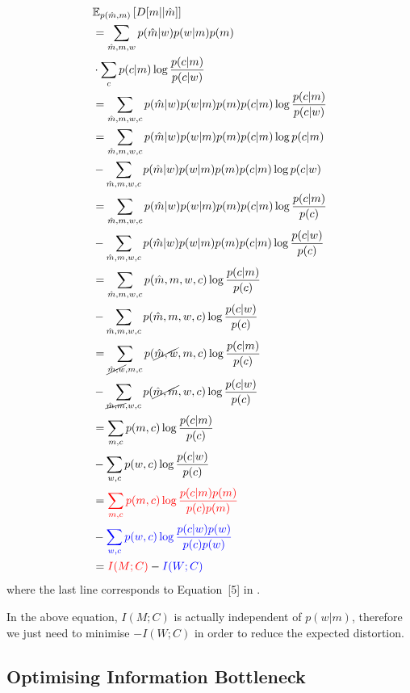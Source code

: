 \documentclass[11pt]{article}
\begin{document}
\begin{align*}
        & \mathbb{E}_{p(\hat{m},m)}\left[D[m||\hat{m}]\right] \\
        & = \sum_{\hat{m},m,w} p(\hat{m}|w)p(w|m)p(m) \\ 
        & \cdot \sum_{c} p(c|m) \log \frac{p(c|m)}{p(c|w)} \\
        & = \sum_{\hat{m},m,w,c} p(\hat{m}|w)p(w|m)p(m)p(c|m)\log \frac{p(c|m)}{p(c|w)} \\
        & = \sum_{\hat{m},m,w,c} p(\hat{m}|w)p(w|m)p(m)p(c|m) \log p(c|m) \\
        & - \sum_{\hat{m},m,w,c} p(\hat{m}|w)p(w|m)p(m)p(c|m) \log p(c|w) \\ 
        & = \sum_{\hat{m},m,w,c} p(\hat{m}|w)p(w|m)p(m)p(c|m) \log \frac{p(c|m)}{p(c)} \\ 
        & - \sum_{\hat{m},m,w,c} p(\hat{m}|w)p(w|m)p(m)p(c|m) \log \frac{p(c|w)}{p(c)} \\ 
        & = \sum_{\hat{m},m,w,c} p(\hat{m},m,w,c) \log \frac{p(c|m)}{p(c)} \\
        & - \sum_{\hat{m},m,w,c} p(\hat{m},m,w,c) \log \frac{p(c|w)}{p(c)} \\ 
        & = \sum_{\cancel{\hat{m},w},m,c} p(\cancel{\hat{m},w},m,c) \log \frac{p(c|m)}{p(c)} \\ 
        & - \sum_{\cancel{\hat{m},m},w,c} p(\cancel{\hat{m},m},w,c) \log \frac{p(c|w)}{p(c)} \\ 
        & = \sum_{m,c} p(m,c) \log \frac{p(c|m)}{p(c)} \\ 
        & - \sum_{w,c} p(w,c) \log \frac{p(c|w)}{p(c)} \\ 
        & = \textcolor{red}{\sum_{m,c} p(m,c) \log \frac{p(c|m)p(m)}{p(c)p(m)}} \\ 
        & - \textcolor{blue}{\sum_{w,c} p(w,c) \log \frac{p(c|w)p(w)}{p(c)p(w)}} \\  
        & = \textcolor{red}{I(M;C)} - \textcolor{blue}{I(W;C)} 
    \label{eq:factorise_distortion}
\end{align*}
where the last line corresponds to Equation~[5] in \citep{zaslavsky2018efficient}.

In the above equation, $I(M;C)$ is actually independent of $p(w|m)$, therefore we just need to minimise $-I(W;C)$ in order to reduce the expected distortion. 

\subsection{Optimising Information Bottleneck}
\label{ssec:comm_opt_ib}
\end{document}
